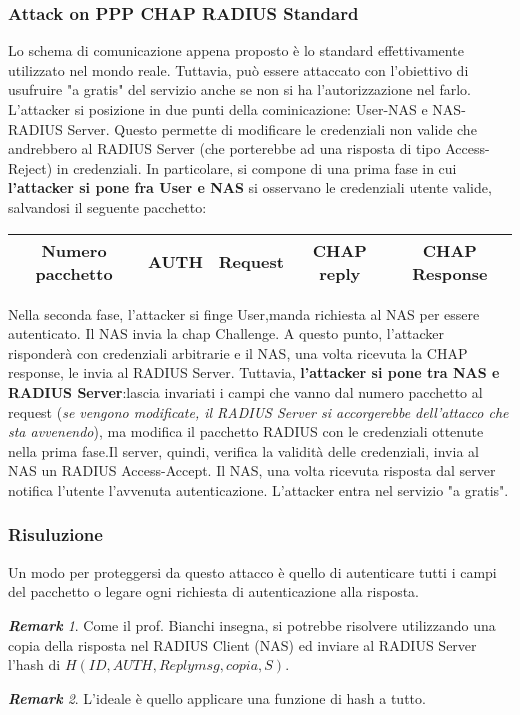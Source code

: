\documentclass{article}
\theoremstyle{remark}
\newtheorem*{remark}{\textbf{Remark}}
\begin{document}
\subsubsection{Attack on PPP CHAP RADIUS Standard}
Lo schema di comunicazione appena proposto è lo standard effettivamente utilizzato nel mondo reale. Tuttavia, può essere attaccato con l'obiettivo di usufruire "a gratis" del servizio anche se non si ha l'autorizzazione nel farlo.\newline 
L'attacker si posizione in due punti della cominicazione: User-NAS e NAS-RADIUS Server. Questo permette di modificare le credenziali non valide che andrebbero al RADIUS Server (che porterebbe ad una risposta di tipo Access-Reject) in credenziali.\newline
In particolare, si compone di una prima fase in cui \textbf{l'attacker si pone fra User e NAS} si osservano le credenziali utente valide, salvandosi il seguente pacchetto:
\begin{center}
\begin{tabular}{ |c|c|c|c|c| } 
\hline
 Numero pacchetto & AUTH & Request & CHAP reply & CHAP Response\\
 \hline
\end{tabular}
\end{center}
Nella seconda fase, l'attacker si finge User,manda richiesta al NAS per essere autenticato. Il NAS invia la chap Challenge. A questo punto, l'attacker risponderà con credenziali arbitrarie e il NAS, una volta ricevuta la CHAP response, le invia al RADIUS Server. Tuttavia, \textbf{l'attacker si pone tra NAS e RADIUS Server}:lascia invariati i campi che vanno dal numero pacchetto al request (\emph{se vengono modificate, il RADIUS Server si accorgerebbe dell'attacco che sta avvenendo}), ma modifica il pacchetto RADIUS con le credenziali ottenute nella prima fase.Il server, quindi, verifica la validità delle credenziali, invia al NAS un RADIUS Access-Accept. Il NAS, una volta ricevuta risposta dal server notifica l'utente l'avvenuta autenticazione.\newline
L'attacker entra nel servizio "a gratis".
\subsubsection{Risuluzione}
Un modo per proteggersi da questo attacco è quello di autenticare tutti i campi del pacchetto o legare ogni richiesta di autenticazione alla risposta.
\begin{remark}
Come il prof. Bianchi insegna, si potrebbe risolvere utilizzando una copia della risposta nel RADIUS Client (NAS) ed inviare al RADIUS Server l'hash di $H(ID,AUTH,Replymsg,copia,S)$.
\end{remark}
\begin{remark}
L'ideale è quello applicare una funzione di hash a tutto.
\end{remark}
\end{document}
